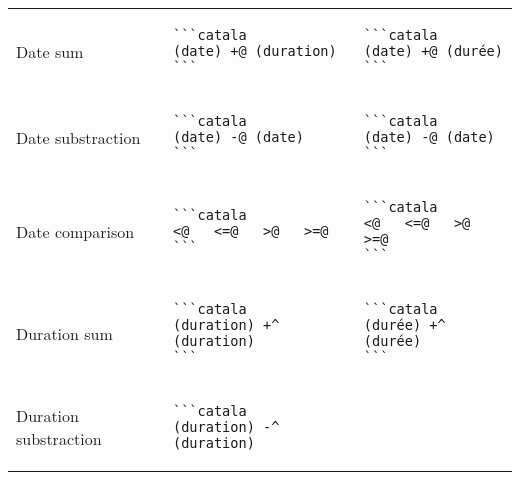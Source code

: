 \documentclass[a3paper,landscape]{article}
\begin{document}
\begin{multicols*}{2}
\begin{center}
\begin{tabular}{p{}p{}p{}}
\\
Date sum&
\vspace*{-1.75em}
\begin{verbatim}
```catala
(date) +@ (duration)
```
\end{verbatim}
\vspace*{-1.75em}
&
\vspace*{-1.75em}
\begin{verbatim}
```catala
(date) +@ (durée)
```
\end{verbatim}
\vspace*{-1.75em}
\\
Date substraction&
\vspace*{-1.75em}
\begin{verbatim}
```catala
(date) -@ (date)
```
\end{verbatim}
\vspace*{-1.75em}
&
\vspace*{-1.75em}
\begin{verbatim}
```catala
(date) -@ (date)
```
\end{verbatim}
\vspace*{-1.75em}
\\
Date comparison&
\vspace*{-1.75em}
\begin{verbatim}
```catala
<@   <=@   >@   >=@
```
\end{verbatim}
\vspace*{-1.75em}
&
\vspace*{-1.75em}
\begin{verbatim}
```catala
<@   <=@   >@   >=@
```
\end{verbatim}
\vspace*{-1.75em}
\\
Duration sum&
\vspace*{-1.75em}
\begin{verbatim}
```catala
(duration) +^ (duration)
```
\end{verbatim}
\vspace*{-1.75em}
&
\vspace*{-1.75em}
\begin{verbatim}
```catala
(durée) +^ (durée)
```
\end{verbatim}
\vspace*{-1.75em}
\\
Duration substraction&
\vspace*{-1.75em}
\begin{verbatim}
```catala
(duration) -^ (duration)

\end{verbatim}
\end{tabular}
\end{center}
\end{multicols*}
\end{document}
